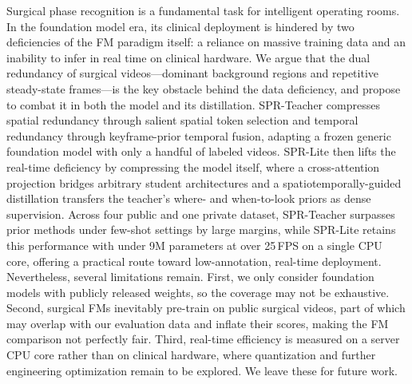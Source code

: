 Surgical phase recognition is a fundamental task for intelligent operating
rooms. In the foundation model era, its clinical deployment is hindered by
two deficiencies of the FM paradigm itself: a reliance on massive training
data and an inability to infer in real time on clinical hardware. We argue
that the dual redundancy of surgical videos---dominant background regions and
repetitive steady-state frames---is the key obstacle behind the data
deficiency, and propose to combat it in both the model and its
distillation. SPR-Teacher compresses spatial redundancy through salient spatial
token selection and temporal redundancy through keyframe-prior temporal
fusion, adapting a frozen generic foundation model with only a handful of
labeled videos. SPR-Lite then lifts the real-time deficiency by
compressing the model itself, where a
cross-attention projection bridges arbitrary student architectures and a
spatiotemporally-guided distillation transfers the teacher's where- and
when-to-look priors as dense supervision. Across four public and one private
dataset, SPR-Teacher surpasses prior methods under few-shot settings by large
margins, while SPR-Lite retains this performance with under 9M
parameters at over 25\,FPS on a single CPU core, offering a practical route
toward low-annotation, real-time deployment.
Nevertheless, several limitations remain. First, we only consider foundation
models with publicly released
weights, so the coverage may not be exhaustive. Second, surgical FMs
inevitably pre-train on public surgical videos, part of which may overlap with
our evaluation data and inflate their scores, making the FM comparison not
perfectly fair. Third, real-time efficiency is measured on a server CPU core
rather than on clinical hardware, where quantization and further engineering
optimization remain to be explored. We leave these for future work.

